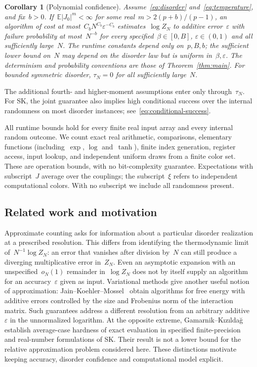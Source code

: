 \documentclass[10pt]{article}
\theoremstyle{plain}
\newtheorem{corollary}[theorem]{Corollary}
\theoremstyle{definition}
\theoremstyle{remark}
\begin{document}
\begin{corollary}[Polynomial confidence]\label{cor:confidence}
Assume~\eqref{eq:disorder} and~\eqref{eq:temperature}, and fix~$b>0$. If~$\mathbb E|J_0|^m<\infty$ for some real~$m>2(p+b)/(p-1)$, an algorithm of cost at most~$C_bN^{C_b}\varepsilon^{-C_b}$ estimates~$\log Z_N$ to additive error~$\varepsilon$ with failure probability at most~$N^{-b}$ for every specified~$\beta\in[0,B]$, $\varepsilon\in(0,1)$ and all sufficiently large~$N$. The runtime constants depend only on~$p,B,b$; the sufficient lower bound on~$N$ may depend on the disorder law but is uniform in~$\beta,\varepsilon$. The determinism and probability conventions are those of Theorem~\ref{thm:main}. For bounded symmetric disorder, $\tau_N=0$ for all sufficiently large~$N$.
\end{corollary}
The additional fourth- and higher-moment assumptions enter only through~$\tau_N$. For SK, the joint guarantee also implies high conditional success over the internal randomness on most disorder instances; see~\eqref{eq:conditional-success}.

All runtime bounds hold for every finite real input array and every internal random outcome. We count exact real arithmetic, comparisons, elementary functions (including~$\exp$, $\log$ and~$\tanh$), finite index generation, register access, input lookup, and independent uniform draws from a finite color set. These are operation bounds, with no bit-complexity guarantee. Expectations with subscript~$J$ average over the couplings; the subscript~$\xi$ refers to independent computational colors. With no subscript we include all randomness present.

\subsection{Related work and motivation}
Approximate counting asks for information about a particular disorder realization at a prescribed resolution. This differs from identifying the thermodynamic limit of~$N^{-1}\log Z_N$: an error that vanishes after division by~$N$ can still produce a diverging multiplicative error in~$Z_N$. Even an asymptotic expansion with an unspecified~$o_N(1)$ remainder in~$\log Z_N$ does not by itself supply an algorithm for an accuracy~$\varepsilon$ given as input. Variational methods give another useful notion of approximation: Jain--Koehler--Mossel~\cite{JKM18} obtain algorithms for free energy with additive errors controlled by the size and Frobenius norm of the interaction matrix. Such guarantees address a different resolution from an arbitrary additive~$\varepsilon$ in the unnormalized logarithm. At the opposite extreme, Gamarnik--K\i z\i lda\u{g}~\cite{GK21} establish average-case hardness of exact evaluation in specified finite-precision and real-number formulations of SK. Their result is not a lower bound for the relative approximation problem considered here. These distinctions motivate keeping accuracy, disorder confidence and computational model explicit.
\end{document}
